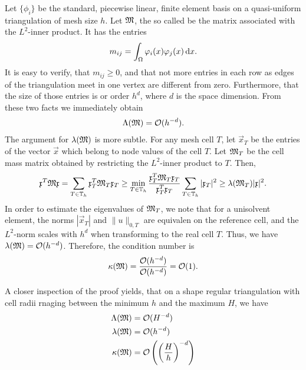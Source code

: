 \begin{example}
  Let $\{\phi_i\}$ be the standard, piecewise linear, finite element
  basis on a quasi-uniform triangulation of mesh size $h$. Let $\mathfrak{M}$, the so called  be the matrix associated with
  the $L^2$-inner product. It has the entries
  \begin{gather*}
    m_{ij} = \int_\Omega \varphi_i(x) \varphi_j(x) \,\mathrm{d} x.
  \end{gather*}
  It is easy to verify, that $m_{ij}\ge 0$, and that not more
  entries in each row as edges of the triangulation meet in one vertex
  are different from zero. Furthermore, that the size of those entries
  is or order $h^d$, where $d$ is the space dimension. From these two
  facts we immediately obtain
  \begin{gather*}
    \Lambda(\mathfrak{M}) = \mathcal O(h^{-d}).
  \end{gather*}
  The argument for $\lambda(\mathfrak{M})$ is more subtle. For any mesh cell
  $T$, let $\vec x_T$ be the entries of the vector $\vec x$ which
  belong to node values of the cell $T$. Let $\mathfrak{M}_T$ be the cell
  mass matrix obtained by restricting the $L^2$-inner product to
  $T$. Then,
  \begin{gather*}
    \mathfrak{x}^T \mathfrak{M} \mathfrak{x}
    = \sum_{T\in\mathbb T_h} \mathfrak{x}^T_T \mathfrak{M}_T \mathfrak{x}_T
    \ge \min_{T\in\mathbb T_h} \frac{\mathfrak{x}^T_T \mathfrak{M}_T \mathfrak{x}_T}{\mathfrak{x}^T_T\mathfrak{x}_T}
    \sum_{T\in\mathbb T_h} |\mathfrak{x}_T|^2 \ge \lambda(\mathfrak{M}_T)  |\mathfrak{x}|^2.
  \end{gather*}
  In order to estimate the eigenvalues of $\mathfrak{M}_T$, we note that for
  a unisolvent element, the norms $|\vec x_T|$ and $\|u\|_{0,T}$ are
  equivalen on the reference cell, and the $L^2$-norm scales with
  $h^d$ when transforming to the real cell $T$. Thus, we have
  $\lambda(\mathfrak{M}) = \mathcal O(h^{-d})$.
  Therefore, the condition number is
  \begin{gather*}
    \kappa(\mathfrak{M}) = \frac{\mathcal O(h^{-d})}{\mathcal O(h^{-d})} = {\mathcal O(1)}.
  \end{gather*}
\end{example}

\begin{note}
  A closer inspection of the proof yields, that on a shape regular
  triangulation with cell radii rnaging between the minimum $h$ and
  the maximum $H$, we have
  \begin{align*}
    \Lambda(\mathfrak{M}) &= \mathcal O(H^{-d}) \\
    \lambda(\mathfrak{M}) &= \mathcal O(h^{-d}) \\
    \kappa(\mathfrak{M}) &= \mathcal O\left(\left(\frac Hh\right)^{-d}\right)
  \end{align*}
\end{note}

